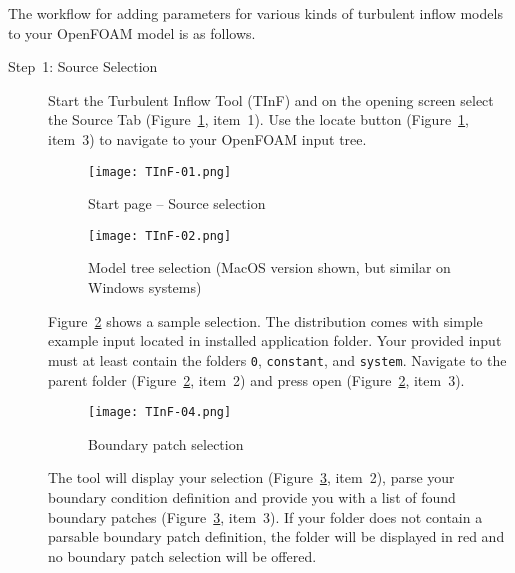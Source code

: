 \label{sec:TInF-usage}

The workflow for adding parameters for various kinds of turbulent inflow models to your 
OpenFOAM model is as follows.

\begin{description}
\item[Step~1: Source Selection] Start the Turbulent Inflow Tool (TInF) and on the opening screen select the Source Tab (Figure~\ref{fig:TInF01}, item~1).  Use the locate button (Figure~\ref{fig:TInF01}, item~3) to navigate to your OpenFOAM input tree.  
\begin{figure}[htb]
	\begin{center}
		\vspace*{-1.0\baselineskip}
		\texttt{[image: TInF-01.png]}
		\vspace*{-1.5\baselineskip}
		\caption{Start page -- Source selection}
		\label{fig:TInF01}
	\end{center}
\end{figure}

\begin{figure}[ht]
	\begin{center}
		\vspace*{-1.0\baselineskip}
		\texttt{[image: TInF-02.png]}
		\vspace*{-1.5\baselineskip}
		\caption{Model tree selection (MacOS version shown, but similar on Windows systems)}
		\label{fig:TInF02}
	\end{center}
\end{figure}
Figure~\ref{fig:TInF02} shows a sample selection. The distribution comes with simple example input located in installed application folder.  Your provided input must at least contain the folders \texttt{0}, \texttt{constant}, and \texttt{system}. Navigate to the parent folder (Figure~\ref{fig:TInF02}, item~2) and press open (Figure~\ref{fig:TInF02}, item~3).

\begin{figure}[ht]
	\begin{center}
		\texttt{[image: TInF-04.png]}
		\caption{Boundary patch selection}
		\label{fig:TInF04}
	\end{center}
\end{figure}
The tool will display your selection (Figure~\ref{fig:TInF04}, item~2), parse your boundary condition definition and provide you with a list of found boundary patches (Figure~\ref{fig:TInF04}, item~3).  If your folder does not contain a parsable boundary patch definition, the folder will be displayed in red and no boundary patch selection will be offered.


\end{description}
